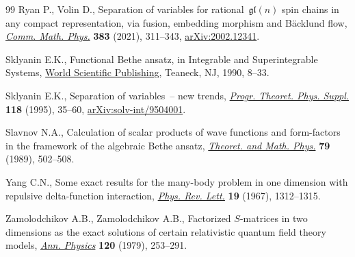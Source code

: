 \documentclass[pdftex]{sigma}
\theoremstyle{definition}
\begin{document}
\begin{thebibliography}{99}
Ryan P., Volin D., Separation of variables for rational~{$\mathfrak{gl}(n)$}
 spin chains in any compact representation, via fusion, embedding morphism and
 {B}\"acklund flow,
 \href{https://doi.org/10.1007/s00220-021-03990-7}{\textit{Comm. Math. Phys.}}
 \textbf{383} (2021), 311--343,
 \href{http://arxiv.org/abs/2002.12341}{arXiv:2002.12341}.

Sklyanin E.K., Functional {B}ethe ansatz, in Integrable and {S}uperintegrable
 {S}ystems, \href{https://doi.org/10.1142/9789812797179_0002}{World Scientific
 Publishing}, Teaneck, NJ, 1990, 8--33.

Sklyanin E.K., Separation of variables~-- new trends,
 \href{https://doi.org/10.1143/PTPS.118.35}{\textit{Progr. Theoret. Phys.
 Suppl.}} \textbf{118} (1995), 35--60,
 \href{http://arxiv.org/abs/solv-int/9504001}{arXiv:solv-int/9504001}.

Slavnov N.A., Calculation of scalar products of wave functions and form-factors
 in the framework of the algebraic {B}ethe ansatz,
 \href{https://doi.org/10.1007/BF01016531}{\textit{Theoret. and Math. Phys.}}
 \textbf{79} (1989), 502--508.

Yang C.N., Some exact results for the many-body problem in one dimension with
 repulsive delta-function interaction,
 \href{https://doi.org/10.1103/PhysRevLett.19.1312}{\textit{Phys. Rev. Lett.}}
 \textbf{19} (1967), 1312--1315.

Zamolodchikov A.B., Zamolodchikov A.B., Factorized {$S$}-matrices in two
 dimensions as the exact solutions of certain relativistic quantum field
 theory models,
 \href{https://doi.org/10.1016/0003-4916(79)90391-9}{\textit{Ann. Physics}}
 \textbf{120} (1979), 253--291.

\end{thebibliography}\LastPageEnding
\end{document}
